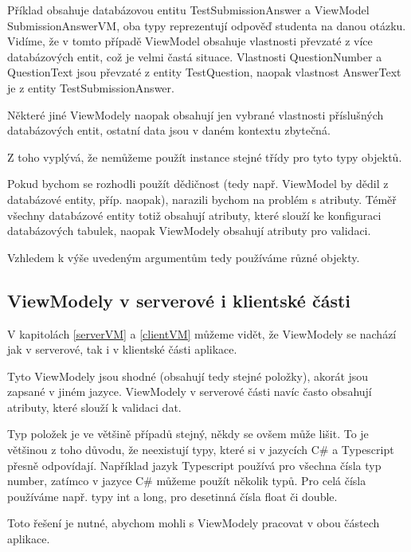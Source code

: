 Příklad obsahuje databázovou entitu TestSubmissionAnswer a ViewModel SubmissionAnswerVM, oba typy reprezentují odpověď studenta na danou otázku.
Vidíme, že v tomto případě ViewModel obsahuje vlastnosti převzaté z více databázových entit, což je velmi častá situace. Vlastnosti QuestionNumber a QuestionText jsou převzaté z entity TestQuestion, naopak vlastnost AnswerText je z entity TestSubmissionAnswer.

Některé jiné ViewModely naopak obsahují jen vybrané vlastnosti příslušných databázových entit, ostatní data jsou v daném kontextu zbytečná.

Z toho vyplývá, že nemůžeme použít instance stejné třídy pro tyto typy objektů.

Pokud bychom se rozhodli použít dědičnost (tedy např. ViewModel by dědil z databázové entity, příp. naopak), narazili bychom na problém s atributy.
Téměř všechny databázové entity totiž obsahují atributy, které slouží ke konfiguraci databázových tabulek, naopak ViewModely obsahují atributy pro validaci. 

Vzhledem k výše uvedeným argumentům tedy používáme různé objekty.


\subsection{ViewModely v serverové i klientské části}

V kapitolách \ref{serverVM} a \ref{clientVM} můžeme vidět, že ViewModely se nachází jak v serverové, tak i v klientské části aplikace. 

Tyto ViewModely jsou shodné (obsahují tedy stejné položky), akorát jsou zapsané v jiném jazyce. ViewModely v serverové části navíc často obsahují atributy, které slouží k validaci dat.

Typ položek je ve většině případů stejný, někdy se ovšem může lišit. To je většinou z toho důvodu, že neexistují typy, které si v jazycích C\# a Typescript přesně odpovídají.
Například jazyk Typescript používá pro všechna čísla typ number, zatímco v jazyce C\# můžeme použít několik typů. 
Pro celá čísla používáme např. typy int a long, pro desetinná čísla float či double.

Toto řešení je nutné, abychom mohli s ViewModely pracovat v obou částech aplikace.